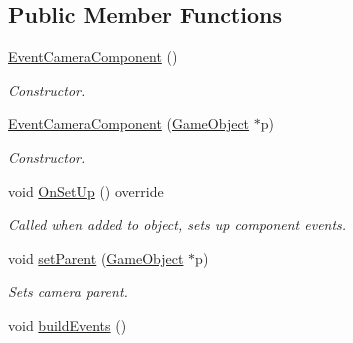 \subsection*{Public Member Functions}
\begin{DoxyCompactItemize}
\item 
\hypertarget{class_event_camera_component_abc07b7411c3fc4976b9b1c2d986cfbfc}{\hyperlink{class_event_camera_component_abc07b7411c3fc4976b9b1c2d986cfbfc}{Event\+Camera\+Component} ()}\label{class_event_camera_component_abc07b7411c3fc4976b9b1c2d986cfbfc}

\begin{DoxyCompactList}\small\item\em Constructor. \end{DoxyCompactList}\item 
\hypertarget{class_event_camera_component_ac4fb242d4e7c859481e520bd990e7f3d}{\hyperlink{class_event_camera_component_ac4fb242d4e7c859481e520bd990e7f3d}{Event\+Camera\+Component} (\hyperlink{class_game_object}{Game\+Object} $\ast$p)}\label{class_event_camera_component_ac4fb242d4e7c859481e520bd990e7f3d}

\begin{DoxyCompactList}\small\item\em Constructor. \end{DoxyCompactList}\item 
\hypertarget{class_event_camera_component_a603f483159f572389fd4f507e8cde88c}{void \hyperlink{class_event_camera_component_a603f483159f572389fd4f507e8cde88c}{On\+Set\+Up} () override}\label{class_event_camera_component_a603f483159f572389fd4f507e8cde88c}

\begin{DoxyCompactList}\small\item\em Called when added to object, sets up component events. \end{DoxyCompactList}\item 
\hypertarget{class_event_camera_component_af7f1cde6285041f3d33707c52c52261e}{void \hyperlink{class_event_camera_component_af7f1cde6285041f3d33707c52c52261e}{set\+Parent} (\hyperlink{class_game_object}{Game\+Object} $\ast$p)}\label{class_event_camera_component_af7f1cde6285041f3d33707c52c52261e}

\begin{DoxyCompactList}\small\item\em Sets camera parent. \end{DoxyCompactList}\item 
\hypertarget{class_event_camera_component_a6a2c0f4293f3f7d35296c9e00709ad40}{void \hyperlink{class_event_camera_component_a6a2c0f4293f3f7d35296c9e00709ad40}{build\+Events} ()}\label{class_event_camera_component_a6a2c0f4293f3f7d35296c9e00709ad40}


\end{DoxyCompactItemize}
